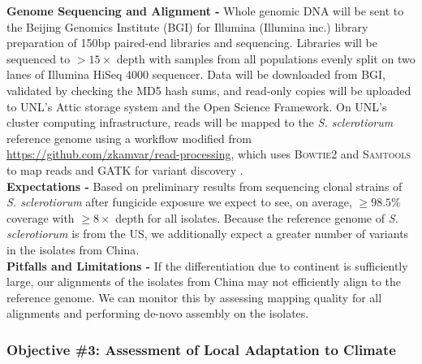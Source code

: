 \documentclass[12pt,letterpaper]{article}
\begin{document}
\noindent \textbf{Genome Sequencing and Alignment -} 
Whole genomic DNA will be sent to the Beijing Genomics Institute (BGI) for Illumina (Illumina inc.) library preparation of 150bp paired-end libraries and sequencing. Libraries will be sequenced to $>15\times$ depth with samples from all populations evenly split on two lanes of Illumina HiSeq 4000 sequencer.
Data will be downloaded from BGI, validated by checking the MD5 hash sums, and read-only copies will be uploaded to UNL's Attic storage system and the Open Science Framework. 
On UNL's cluster computing infrastructure, reads will be mapped to the \textit{S. sclerotiorum} reference genome using a workflow modified from \url{https://github.com/zkamvar/read-processing}, which uses \textsc{Bowtie2} and \textsc{Samtools} to map reads and \textsc{GATK} for variant discovery \citep{langmead2012fast, li2009sequence, mckenna2010genome, derbyshire2017complete}.\\ 
\noindent \textbf{Expectations -}
Based on preliminary results from sequencing clonal strains of \textit{S. sclerotiorum} after fungicide exposure we expect to see, on average, $\geq98.5\%$ coverage with $\geq8\times$ depth for all isolates. Because the reference genome of \textit{S. sclerotiorum} is from the US, we additionally expect a greater number of variants in the isolates from China.\\
\noindent \textbf{Pitfalls and Limitations -}
If the differentiation due to continent is sufficiently large, our alignments of the isolates from China may not efficiently align to the reference genome. 
We can monitor this by assessing mapping quality for all alignments and performing de-novo assembly on the isolates.

\subsubsection{Objective \#3: Assessment of Local Adaptation to Climate}
\end{document}
